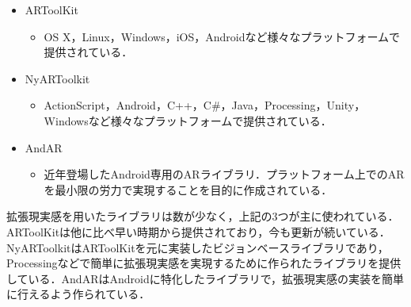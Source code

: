 \begin{itemize}
 \item ARToolKit\cite{ARToolKit}
       \begin{itemize}
	\item OS X，Linux，Windows，iOS，Androidなど様々なプラットフォームで提供されている．
       \end{itemize}
 \item NyARToolkit\cite{NyARToolkit}
       \begin{itemize}
	\item ActionScript，Android，C++，C\#，Java，Processing，Unity，Windowsなど様々なプラットフォームで提供されている．
       \end{itemize}
 \item AndAR\cite{AndAR}
       \begin{itemize}
	\item 近年登場したAndroid専用のARライブラリ．プラットフォーム上でのARを最小限の労力で実現することを目的に作成されている．
       \end{itemize}
\end{itemize}	

拡張現実感を用いたライブラリは数が少なく，上記の3つが主に使われている．ARToolKitは他に比べ早い時期から提供されており，今も更新が続いている．NyARToolkitはARToolKitを元に実装したビジョンベースライブラリであり，Processingなどで簡単に拡張現実感を実現するために作られたライブラリを提供している．AndARはAndroidに特化したライブラリで，拡張現実感の実装を簡単に行えるよう作られている．
